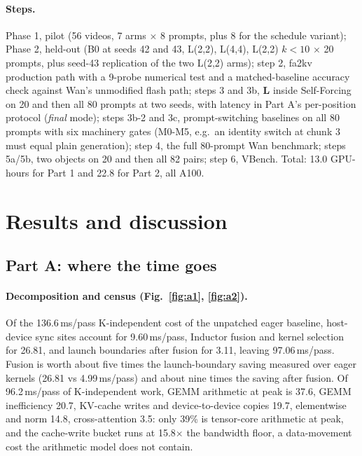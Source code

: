 \documentclass[10pt,a4paper]{article}
\newcommand{\arm}[1]{\textbf{#1}}
\begin{document}
\paragraph{Steps.} Phase 1, pilot (56 videos, 7 arms $\times$ 8 prompts, plus 8 for the schedule variant); Phase 2, held-out (B0 at seeds 42 and 43, L(2,2), L(4,4), L(2,2) $k{<}10$ $\times$ 20 prompts, plus seed-43 replication of the two L(2,2) arms); step 2, fa2kv production path with a 9-probe numerical test and a matched-baseline accuracy check against Wan's unmodified flash path; steps 3 and 3b, \arm{L} inside Self-Forcing on 20 and then all 80 prompts at two seeds, with latency in Part A's per-position protocol (\emph{final} mode); steps 3b-2 and 3c, prompt-switching baselines on all 80 prompts with six machinery gates (M0-M5, e.g.\ an identity switch at chunk 3 must equal plain generation); step 4, the full 80-prompt Wan benchmark; steps 5a/5b, two objects on 20 and then all 82 pairs; step 6, VBench. Total: 13.0 GPU-hours for Part 1 and 22.8 for Part 2, all A100.

\section{Results and discussion}

\subsection{Part A: where the time goes}
\paragraph{Decomposition and census (Fig.~\ref{fig:a1}, \ref{fig:a2}).} Of the 136.6\,ms/pass K-independent cost of the unpatched eager baseline, host-device sync sites account for 9.60\,ms/pass, Inductor fusion and kernel selection for 26.81, and launch boundaries after fusion for 3.11, leaving 97.06\,ms/pass. Fusion is worth about five times the launch-boundary saving measured over eager kernels (26.81 vs 4.99\,ms/pass) and about nine times the saving after fusion. Of 96.2\,ms/pass of K-independent work, GEMM arithmetic at peak is 37.6, GEMM inefficiency 20.7, KV-cache writes and device-to-device copies 19.7, elementwise and norm 14.8, cross-attention 3.5: only 39\% is tensor-core arithmetic at peak, and the cache-write bucket runs at 15.8$\times$ the bandwidth floor, a data-movement cost the arithmetic model does not contain.
\end{document}
